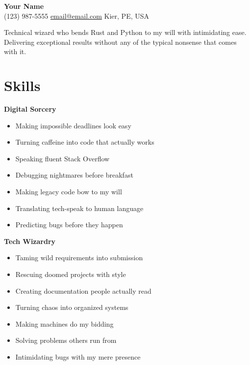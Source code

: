 \documentclass[11pt]{article}
\begin{document}
\begin{center}
	{\headingfont\Huge\textbf{Your Name}} \\
  (123) 987-5555 \textperiodcentered \href{mailto:email@email.com}{email@email.com} \textperiodcentered Kier, PE, USA
\end{center}

\begin{center}
\noindent Technical wizard who bends Rust and Python to my will with intimidating ease. Delivering exceptional results without any of the typical nonsense that comes with it.
\end{center}


\section*{\headingfont Skills}
\noindent
\begin{multicols}{2}
    \noindent
    \begin{minipage}[t]{\columnwidth}
        {\headingfont\textbf{Digital Sorcery}}
		\begin{itemize}[label=›, leftmargin=1em, noitemsep, topsep=0pt]
            \item Making impossible deadlines look easy
            \item Turning caffeine into code that actually works
            \item Speaking fluent Stack Overflow
            \item Debugging nightmares before breakfast
            \item Making legacy code bow to my will
            \item Translating tech-speak to human language
            \item Predicting bugs before they happen
        \end{itemize}
    \end{minipage}
    \columnbreak
    \noindent
    \begin{minipage}[t]{\columnwidth}
        {\headingfont\textbf{Tech Wizardry}}
		\begin{itemize}[label=›, leftmargin=1em, noitemsep, topsep=0pt]
            \item Taming wild requirements into submission
            \item Rescuing doomed projects with style
            \item Creating documentation people actually read
            \item Turning chaos into organized systems
            \item Making machines do my bidding
            \item Solving problems others run from
            \item Intimidating bugs with my mere presence
        \end{itemize}
    \end{minipage}
\end{multicols}
\end{document}
